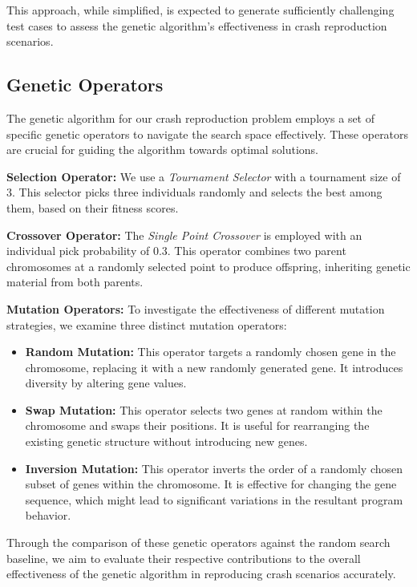         This approach, while simplified, is expected to generate sufficiently challenging test cases to assess the 
        genetic algorithm's effectiveness in crash reproduction scenarios.

    \subsection{Genetic Operators}
        The genetic algorithm for our crash reproduction problem employs a set of specific genetic operators to navigate 
        the search space effectively. These operators are crucial for guiding the algorithm towards optimal solutions.
    
        \textbf{Selection Operator:} We use a \textit{Tournament Selector} with a tournament size of 3. This selector 
        picks three individuals randomly and selects the best among them, based on their fitness scores.
    
        \textbf{Crossover Operator:} The \textit{Single Point Crossover} is employed with an individual pick probability
        of 0.3. This operator combines two parent chromosomes at a randomly selected point to produce offspring,
        inheriting genetic material from both parents.
    
        \textbf{Mutation Operators:} To investigate the effectiveness of different mutation strategies, we examine three
        distinct mutation operators:
    
        \begin{itemize}
            \item \textbf{Random Mutation:} This operator targets a randomly chosen gene in the chromosome, replacing it
                with a new randomly generated gene. It introduces diversity by altering gene values.
            \item \textbf{Swap Mutation:} This operator selects two genes at random within the chromosome and swaps
                their positions. It is useful for rearranging the existing genetic structure without introducing new genes.
            \item \textbf{Inversion Mutation:} This operator inverts the order of a randomly chosen subset of genes
                within the chromosome. It is effective for changing the gene sequence, which might lead to significant
                variations in the resultant program behavior.
        \end{itemize}
        
        Through the comparison of these genetic operators against the random search baseline, we aim to evaluate their
        respective contributions to the overall effectiveness of the genetic algorithm in reproducing crash scenarios
        accurately.
    
